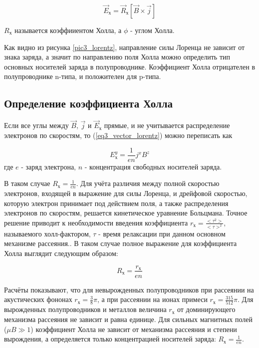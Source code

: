 \begin{equation}
\overrightarrow{E}_{\text{х}} = \overrightarrow{R}_{\text{х}} \left[ \overrightarrow{B} \times \overrightarrow{j} \right]
\label{eq3_vector_lorentz}
\end{equation}

$R_{\text{х}}$ называется коэффииентом Холла, а $\phi$ - углом Холла.

Как видно из рисунка \ref{pic3_lorentz}, направление силы Лоренца не зависит от знака заряда, а значит по направлению поля Холла можно определить тип основных носителей заряда в полупроводнике. Коэффициент Холла отрицателен в полупроводнике n-типа, и положителен для p-типа.

\subsection{Определение коэффициента Холла}

Если все углы между $\overrightarrow{B}$, $\overrightarrow{j}$ и $\overrightarrow{E}_{\text{х}}$ прямые, и не учитывается распределение электронов по скоростям, то (\ref{eq3_vector_lorentz}) можно переписать как

\begin{equation}
E^{y}_{\text{х}} = \frac{1}{e n} j^{x} B^{z}
\end{equation}
где $e$ - заряд электрона, $n$ - концентрация свободных носителей заряда.

В таком случае $R_{\text{х}} = \frac{1}{e n}$. Для учёта различия между полной скоростью электронов, входящей в выражение для силы Лоренца, и дрейфовой скоростью, которую электрон принимает под действием поля, а также распределения электронов по скоростям, решается кинетическое уравнение Больцмана. Точное решение приводит к необходимости введения коэффициента $r_{\text{х}} = \frac{<\tau^{2}>}{<\tau>^2}$, называемого холл-фактором, $\tau$ - время релаксации при данном основном механизме рассеяния.. В таком случае полное выражение для коэффициента Холла выглядит следующим образом:

\begin{equation}
R_{\text{х}} = \frac{r_{\text{х}}}{e n}
\end{equation}

Расчёты показывают, что для невырожденных полупроводников при рассеянии на акустических фононах $r_{\text{х}} = \frac{3}{8} \pi$, а при рассеянии на ионах примеси $r_{\text{х}} = \frac{315}{512} \pi$. Для вырожденных полупроводников и металлов величина $r_{\text{х}}$ от доминирующего механизма рассеяния не зависит и равна единице. Для сильных магнитных полей ($\mu B \gg 1$) коэффициент Холла не зависит от механизма рассеяния и степени вырождения, а определяется только концентрацией носителей заряда: $R_{\text{х}} = \frac{1}{e n}$.

